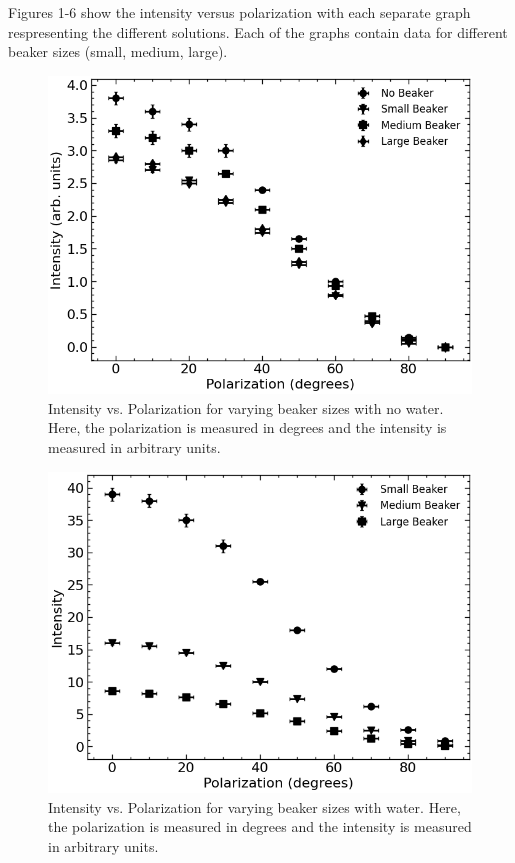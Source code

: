 Figures 1-6 show the intensity versus polarization with each separate graph respresenting the different solutions. Each of the graphs contain data for different beaker sizes (small, medium, large).

\begin{figure}[H]
    \begin{center}
        \includegraphics[width=\columnwidth]{../figures/no_water.png}
    \end{center}
    \caption{Intensity vs. Polarization for varying beaker sizes with no water. Here, the polarization is measured in degrees and the intensity is measured in arbitrary units.}
    \label{fig:no_water}
\end{figure}

\begin{figure}[H]
    \begin{center}
        \includegraphics[width=\columnwidth]{../figures/water.png}
    \end{center}
    \caption{Intensity vs. Polarization for varying beaker sizes with water. Here, the polarization is measured in degrees and the intensity is measured in arbitrary units.}
    \label{fig:water}
\end{figure}

